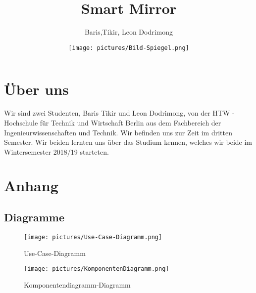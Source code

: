 \documentclass[a4paper,11pt]{article}
\author{Baris,Tikir, Leon Dodrimong}
\title{Smart Mirror}
\date{
\vspace{2cm}
\texttt{[image: pictures/Bild-Spiegel.png]}}
\begin{document}
\maketitle

\newpage
\tableofcontents
\newpage












\section{Über uns}
Wir sind zwei Studenten, Baris Tikir und Leon Dodrimong, von der HTW - Hochschule für Technik und Wirtschaft Berlin aus dem Fachbereich der Ingenieurwissenschaften und Technik. Wir befinden uns zur Zeit im dritten Semester. Wir beiden lernten uns über das Studium kennen, welches wir beide im Wintersemester 2018/19 starteten.

\newpage{}
\section{Anhang}
\subsection{Diagramme}
\label{UseCase}
\begin{figure}[h]
\centering
\texttt{[image: pictures/Use-Case-Diagramm.png]}
\caption{Use-Case-Diagramm}
\end{figure}
\label{Komponentendiagramm}
\begin{figure}[h]
\centering
\texttt{[image: pictures/KomponentenDiagramm.png]}
\caption{Komponentendiagramm-Diagramm}
\end{figure}
\end{document}
